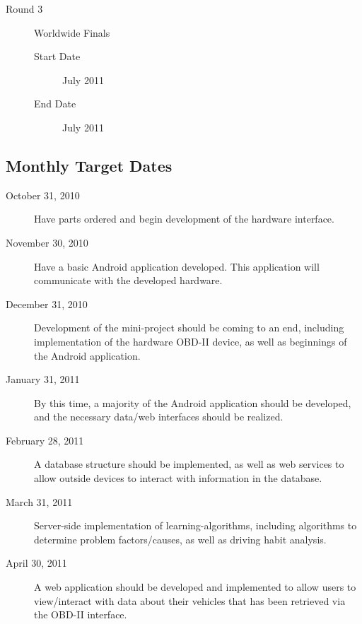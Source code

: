\documentclass[12pt]{article}
\begin{document}
\begin{description}
\begin{description}
		\item[Round 3] Worldwide Finals
		\begin{description}
			\item[Start Date] July 2011
			\item[End Date] July 2011
		\end{description}
		
	\end{description}	
\end{description}

\subsection{Monthly Target Dates}\label{subsec:MonthlyTargetDates}

\begin{description}
	\item[October 31, 2010] Have parts ordered and begin development of the hardware interface.
	\item[November 30, 2010] Have a basic Android application developed.  This application will communicate with the developed hardware.
	\item[December 31, 2010] Development of the mini-project should be coming to an end, including implementation of the hardware OBD-II device, as well as beginnings of the Android application.
	\item[January 31, 2011] By this time, a majority of the Android application should be developed, and the necessary data/web interfaces should be realized.
	\item[February 28, 2011] A database structure should be implemented, as well as web services to allow outside devices to interact with information in the database.
	\item[March 31, 2011] Server-side implementation of learning-algorithms, including algorithms to determine problem factors/causes, as well as driving habit analysis.
	\item[April 30, 2011] A web application should be developed and implemented to allow users to view/interact with data about their vehicles that has been retrieved via the OBD-II interface.
\end{description}
\end{document}
